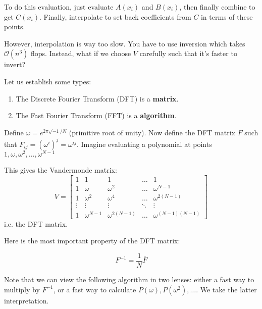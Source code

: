 To do this evaluation, just evaluate $A(x_i)$ and $B(x_i)$, then finally combine to get
$C(x_i)$. Finally, interpolate to set back coefficients from $C$ in terms of these points.

However, interpolation is way too slow. You have to use inversion
which takes $\mathcal{O}(n^3)$ flops. Instead, what if we choose $V$ carefully
such that it's faster to invert?

Let us establish some types:
\begin{enumerate}
    \item The Discrete Fourier Transform (DFT) is a \textbf{matrix}.
    \item The Fast Fourier Transform (FFT) is a \textbf{algorithm}.
\end{enumerate}

\begin{definition} 
    Define $\omega = e^{2\pi \sqrt{-1}/N}$ (primitive root of unity). Now define the DFT matrix $F$
    such that $F_{ij} = (\omega^i)^j = \omega^{ij}$.
    Imagine evaluating a polynomial at points $1, \omega, \omega^2, \dots, \omega^{N - 1}$

    This gives the Vandermonde matrix:
    \[ V = \begin{bmatrix}
        1 & 1 & 1 & \dots & 1 \\
        1 & \omega & \omega^2 & \dots & \omega^{N-1} \\
        1 & \omega^2 & \omega^4 & \dots & \omega^{2(N-1)} \\
        \vdots & \vdots & \vdots & \ddots & \vdots \\
        1 & \omega^{N - 1} & \omega^{2(N - 1)} & \dots & \omega^{(N-1)(N - 1)}
    \end{bmatrix} \]
    i.e. the DFT matrix.
\end{definition}

Here is the most important property of the DFT matrix:
\begin{note} 
    \[ F^{-1} = \frac{1}{N} \overline{F} \]
\end{note}

Note that we can view the following algorithm in two lenses: either a fast way
to multiply by $F^{-1}$, or a fast way to calculate $P(\omega), P(\omega^2), \dots$.
We take the latter interpretation.


